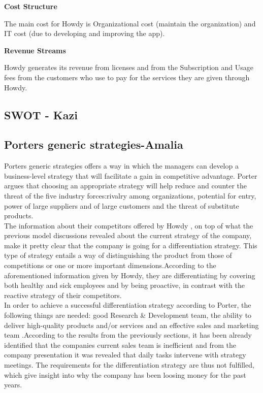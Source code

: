 \noindent \textbf{Cost Structure}

\noindent The main cost for Howdy is Organizational cost (maintain the organization) and IT cost (due to developing and improving the app).

\noindent \textbf{Revenue Streams}

\noindent Howdy generates its revenue from licenses and from the Subscription and Usage fees from the customers who use to pay for the services they are given through Howdy.



\subsection{SWOT - Kazi}

\subsection{Porters generic strategies-Amalia}
Porters generic strategies offers a way in which the managers can develop a business-level strategy that will facilitate a gain in competitive advantage\cite[p.190]{jones_george_2013}. Porter argues that choosing an appropriate strategy will help reduce and counter the threat of the five industry forces:rivalry among organizations, potential for entry, power of large suppliers and of large customers and the threat of substitute products\cite[p.189-190]{jones_george_2013}.\\
\noindent The information about their competitors offered by Howdy \cite{Extrainfo}, on top of what the previous model discussions revealed about the current strategy of the company, make it pretty clear that the company is going for a differentiation strategy. This type of strategy entails a way of distinguishing the product from those of competitions or one or more important dimensions\cite[p.191]{jones_george_2013}.According to the aforementioned information given by Howdy, they are differentiating by covering both healthy and sick employees and by being proactive, in contrast with the reactive strategy of their competitors. \\
\noindent In order to achieve a successful differentiation strategy according to Porter, the following things are needed: good Research \& Development team, the ability to deliver high-quality products and/or services and an effective sales and marketing team \cite{mind_tools_porter}.According to the results from the previously sections, it has been already identified that the companies current sales team is inefficient and from the company presentation\cite[s.11]{oneofthepresentations} it was revealed that daily tasks intervene with strategy meetings. The requirements for the differentiation strategy are thus not  fulfilled, which give insight into why the company has been loosing money for the past years. 


